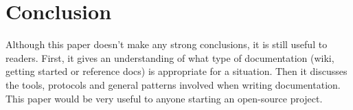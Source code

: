 \documentclass[titlepage]{article}
\begin{document}
\section{Conclusion}

Although this paper doesn't make any strong conclusions, it is still useful to readers. First, it gives an understanding of what type of documentation (wiki, getting started or reference docs) is appropriate for a situation. Then it discusses the tools, protocols and general patterns involved when writing documentation. This paper would be very useful to anyone starting an open-source project.



\end{document}
